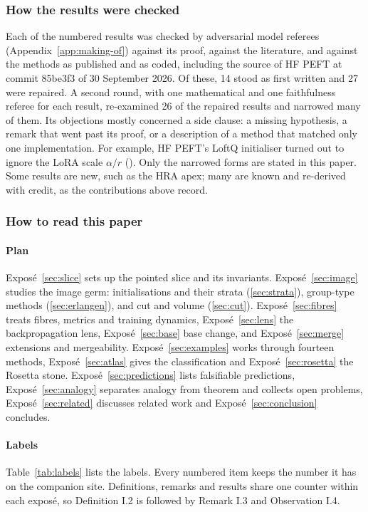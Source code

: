 \subsubsection{How the results were checked}

Each of the \nPropositions{} numbered results was checked by adversarial model referees (Appendix~\ref{app:making-of}) against its proof, against the literature, and against the methods as published and as coded, including the source of HF PEFT at commit 85be3f3 of 30 September 2026. Of these, 14 stood as first written and 27 were repaired. A second round, with one mathematical and one faithfulness referee for each result, re-examined 26 of the repaired results and narrowed many of them. Its objections mostly concerned a side clause: a missing hypothesis, a remark that went past its proof, or a description of a method that matched only one implementation. For example, HF PEFT's LoftQ initialiser turned out to ignore the LoRA scale $\alpha/r$ (). Only the narrowed forms are stated in this paper. Some results are new, such as the HRA apex; many are known and re-derived with credit, as the contributions above record.

\subsubsection{How to read this paper}

\paragraph{Plan}
Exposé~\ref{sec:slice} sets up the pointed slice and its invariants. Exposé~\ref{sec:image} studies the image germ: initialisations and their strata (\ref{sec:strata}), group-type methods (\ref{sec:erlangen}), and cut and volume (\ref{sec:cut}). Exposé~\ref{sec:fibres} treats fibres, metrics and training dynamics, Exposé~\ref{sec:lens} the backpropagation lens, Exposé~\ref{sec:base} base change, and Exposé~\ref{sec:merge} extensions and mergeability. Exposé~\ref{sec:examples} works through fourteen methods, Exposé~\ref{sec:atlas} gives the classification and Exposé~\ref{sec:rosetta} the Rosetta stone. Exposé~\ref{sec:predictions} lists falsifiable predictions, Exposé~\ref{sec:analogy} separates analogy from theorem and collects open problems, Exposé~\ref{sec:related} discusses related work and Exposé~\ref{sec:conclusion} concludes.

\paragraph{Labels}
Table~\ref{tab:labels} lists the labels. Every numbered item keeps the number it has on the companion site. Definitions, remarks and results share one counter within each exposé, so Definition I.2 is followed by Remark I.3 and Observation I.4.

